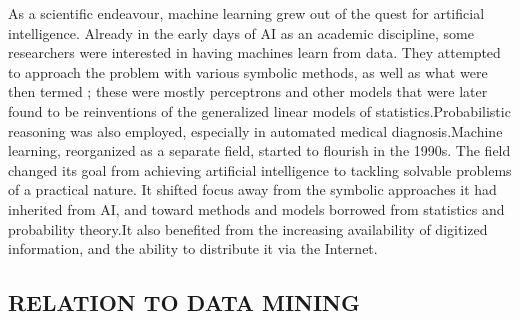 \begin{enumerate}
    As a scientific endeavour, machine learning grew out of the quest for artificial intelligence. Already in the early days of AI as an academic discipline, some researchers were interested in having machines learn from data. They attempted to approach the problem with various symbolic methods, as well as what were then termed ; these were mostly perceptrons and other models that were later found to be reinventions of the generalized linear models of statistics.Probabilistic reasoning was also employed, especially in automated medical diagnosis.Machine learning, reorganized as a separate field, started to flourish in the 1990s. The field changed its goal from achieving artificial intelligence to tackling solvable problems of a practical nature. It shifted focus away from the symbolic approaches it had inherited from AI, and toward methods and models borrowed from statistics and probability theory.It also benefited from the increasing availability of digitized information, and the ability to distribute it via the Internet. 
    
    \subsection{RELATION TO DATA MINING}
\end{enumerate}